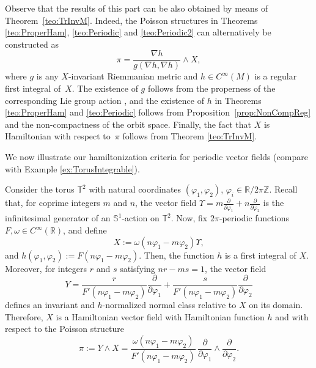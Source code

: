 \documentclass[pdftex]{sigma}%
\numberwithin{equation}{section}
\begin{document}
Observe that the results of this part can be also obtained by means of Theorem~\ref{teo:TrInvM}. Indeed, the Poisson structures in Theorems \ref{teo:ProperHam}, \ref{teo:Periodic} and \ref{teo:Periodic2} can alternatively be constructed as
 \begin{equation*}
 \pi=\frac{\nabla h}{g(\nabla h,\nabla h)}\wedge X,
 \end{equation*}
where $g$ is any $X$-invariant Riemmanian metric and $h \in C^{\infty}(M)$ is a regular first integral of~$X$. The existence of $g$ follows from the properness of the corresponding Lie group action \cite[Proposition 2.5.2]{Duistermaat-1999}, and the existence of $h$ in Theorems \ref{teo:ProperHam} and \ref{teo:Periodic} follows from Proposition~\ref{prop:NonCompReg} and the non-compactness of the orbit space. Finally, the fact that $X$ is Hamiltonian with respect to~$\pi$ follows from Theorem \ref{teo:TrInvM}.

We now illustrate our hamiltonization criteria for periodic vector fields (compare with Example \ref{ex:TorusIntegrable}).

\begin{Example}
Consider the torus $\mathbb{T}^2$ with natural coordinates $(\varphi_1,\varphi_2)$, $\varphi_i \in \mathbb{R}/2\pi\mathbb{Z}$.
Recall that, for coprime integers $m$ and $n$, the vector field $\Upsilon = m \tfrac{\partial}{\partial\varphi_1} + n\tfrac{\partial}{\partial\varphi_2}$ is the infinitesimal generator of an $\mathbb{S}^1$-action on $\mathbb{T}^2$. Now, fix $2\pi$-periodic functions $F,\omega\in C^{\infty}(\mathbb{R})$, and define
 \begin{equation*}
 X := \omega(n\varphi_1-m\varphi_2) \Upsilon,
 \end{equation*}
and $h(\varphi_{1}, \varphi_{2}):=F(n\varphi_{1} - m\varphi_{2})$. Then, the function $h$ is a first integral of $X$.
Moreover, for integers $r$ and $s$ satisfying $nr-ms=1$, the vector field
 \begin{equation*}
 Y = \frac{r}{F'(n\varphi_{1} - m\varphi_{2})}\frac{\partial}{\partial\varphi_1} + \frac{s}{F'(n\varphi_{1} - m\varphi_{2})}\frac{\partial}{\partial\varphi_2}
 \end{equation*}
defines an invariant and $h$-normalized normal class relative to $X$ on its domain.
Therefore, $X$ is a Hamiltonian vector field with Hamiltonian function $h$ and with respect to the Poisson structure
 \begin{equation*}
 \pi := Y \wedge X = \frac{\omega(n\varphi_1-m\varphi_2)}{F'(n\varphi_{1} - m\varphi_{2})}\, \frac{\partial}{\partial \varphi_1}\wedge \frac{\partial}{\partial \varphi_2}.
 \end{equation*}
\end{Example}
\end{document}

